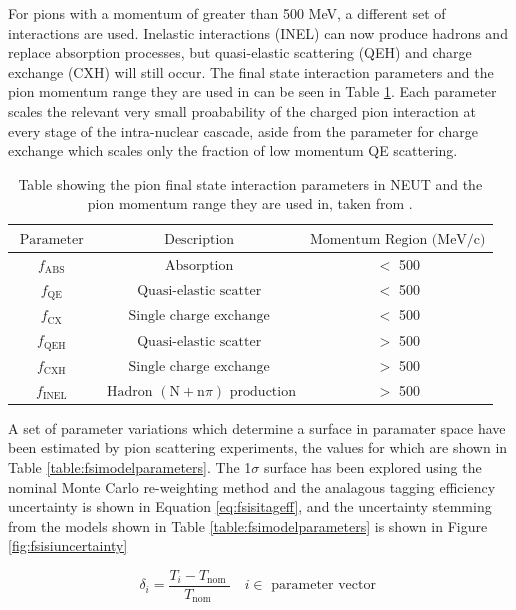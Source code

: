 For pions with a momentum of greater than 500 MeV, a different set of interactions are used. Inelastic interactions (INEL) can now produce hadrons and replace absorption processes, but quasi-elastic scattering (QEH) and charge exchange (CXH) will still occur. The final state interaction parameters and the pion momentum range they are used in can be seen in Table \ref{table:fsiparameters}. Each parameter scales the relevant very small proabability of the charged pion interaction at every stage of the intra-nuclear cascade, aside from the parameter for charge exchange which scales only the fraction of low momentum QE scattering. 


\begin{table}
\centering
\begin{tabular}{||ccc||}
\hline
$\text { Parameter }$ & $\text { Description }$ & $\text{Momentum Region (MeV/c)}$\\
\hline
$f_{\text{ABS}}$ & $\text{Absorption}$ & $<$ 500 \\
$f_{\text{QE}}$ & $\text { Quasi-elastic scatter }$ & $<$ 500 \\
$f_{\text{CX}}$ & $\text { Single charge exchange }$ & $<$ 500 \\
$f_{\text{QEH}}$ & $\text { Quasi-elastic scatter }$ & $>$ 500 \\
$f_{\text{CXH}}$ & $\text { Single charge exchange }$ & $>$ 500 \\
$f_{\text{INEL}}$ & $\text { Hadron }(\text{N}+\text{n}\pi)$ $\text {production}$ & $>$ 500 \\
\hline
\end{tabular}
\caption{Table showing the pion final state interaction parameters in NEUT and the pion momentum range they are used in, taken from \cite{tn_32}.}
\label{table:fsiparameters}
\end{table}



A set of parameter variations which determine a surface in paramater space have been estimated by pion scattering experiments, the values for which are shown in Table \ref{table:fsimodelparameters}. The 1$\sigma$ surface has been explored using the nominal Monte Carlo re-weighting method and the analagous tagging efficiency uncertainty is shown in Equation \ref{eq:fsisitageff}, and the uncertainty stemming from the models shown in Table \ref{table:fsimodelparameters} is shown in Figure \ref{fig:fsisiuncertainty}

\begin{equation}
\delta_{i}=\frac{T_{i}-T_{\text {nom }}}{T_{\text {nom }}} \quad i \in \text { parameter vector }
\label{eq:fsisitageff}
\end{equation}

